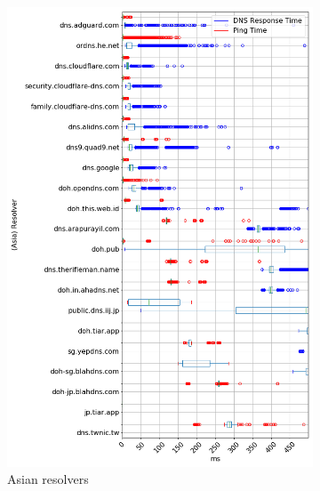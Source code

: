 \begin{figure}[t!]
\begin{subfigure}[t]{0.5\textwidth}
        \includegraphics[width=\linewidth]{figures/Frankfurt_Asia.png}
        \caption{Asian resolvers}
    \end{subfigure}
    ~ 
    \begin{subfigure}[t]{0.5\textwidth}
        \centering

\end{subfigure}
\end{figure}
